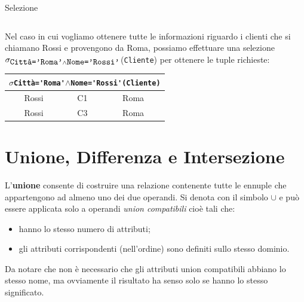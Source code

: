 \begin{Example}{Selezione}{}
\begin{center}
\begin{tabular}{|c|c|c|}
        \end{tabular}
    \end{center}
    Nel caso in cui vogliamo ottenere tutte le informazioni riguardo i clienti che si chiamano Rossi e provengono da Roma, possiamo effettuare una selezione $\sigma_{\verb|Città='Roma'|\land\verb|Nome='Rossi'|}$(\verb|Cliente|) per ottenere le tuple richieste:
    \begin{center}
        \begin{tabular}{|c|c|c|}
            \hline\multicolumn{3}{|c|}{$\sigma$\scriptsize\Verb|Città='Roma'|$\land$\Verb|Nome='Rossi'|\normalsize\Verb|(Cliente)|}\\\hline
            Rossi & C1 & Roma\\
            Rossi & C3 & Roma\\\hline
        \end{tabular}
    \end{center}
\end{Example}

\section{Unione, Differenza e Intersezione}
\begin{redbar}
    L'\textbf{unione} consente di costruire una relazione contenente tutte le ennuple che appartengono ad almeno uno dei due operandi. Si denota con il simbolo $\cup$ e può essere applicata solo a operandi \textit{union compatibili} cioè tali che:
    \begin{itemize}
        \item hanno lo stesso numero di attributi;
        \item gli attributi corrispondenti (nell'ordine) sono definiti sullo stesso dominio.
    \end{itemize}
\end{redbar}
Da notare che non è necessario che gli attributi union compatibili abbiano lo stesso nome, ma ovviamente il risultato ha senso solo se hanno lo stesso significato.

